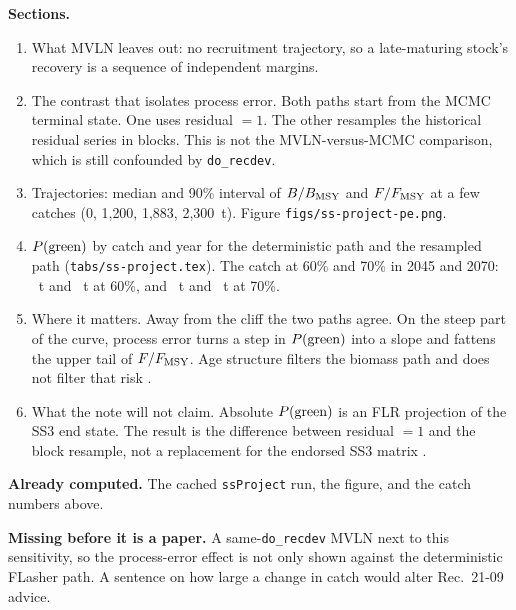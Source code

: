 \documentclass[11pt,a4paper]{article}
\begin{document}
\textbf{Sections.}
\begin{enumerate}[leftmargin=*]
  \item What MVLN leaves out: no recruitment trajectory, so a late-maturing
    stock's recovery is a sequence of independent margins.
  \item The contrast that isolates process error. Both paths start from the
    MCMC terminal state. One uses residual $= 1$. The other resamples the
    historical residual series in blocks. This is not the MVLN-versus-MCMC
    comparison, which is still confounded by \texttt{do\_recdev}.
  \item Trajectories: median and 90\% interval of $B/B_{\mathrm{MSY}}$ and $F/F_{\mathrm{MSY}}$ at a few
    catches (0, 1{,}200, 1{,}883, 2{,}300~t). Figure
    \texttt{figs/ss-project-pe.png}.
  \item $P(\mathrm{green})$ by catch and year for the deterministic path and the resampled
    path (\texttt{tabs/ss-project.tex}). The catch at 60\% and 70\% in 2045
    and 2070: \tacPeFortyFiveSixty~t and \tacPeSeventySixty~t at 60\%, and
    \tacPeFortyFiveSeventy~t and \tacPeSeventySeventy~t at 70\%.
  \item Where it matters. Away from the cliff the two paths agree. On the
    steep part of the curve, process error turns a step in $P(\mathrm{green})$ into a
    slope and fattens the upper tail of $F/F_{\mathrm{MSY}}$. Age structure filters the
    biomass path and does not filter that risk
    \citep{Winker2020SMA}.
  \item What the note will not claim. Absolute $P(\mathrm{green})$ is an FLR projection of
    the SS3 end state. The result is the difference between residual $= 1$
    and the block resample, not a replacement for the endorsed SS3 matrix
    \citep{Liniers2026}.
\end{enumerate}

\textbf{Already computed.} The cached \texttt{ssProject} run, the figure, and
the catch numbers above.

\textbf{Missing before it is a paper.} A same-\texttt{do\_recdev} MVLN next
to this sensitivity, so the process-error effect is not only shown against
the deterministic FLasher path. A sentence on how large a change in catch
would alter Rec.~21-09 advice.



\end{document}

